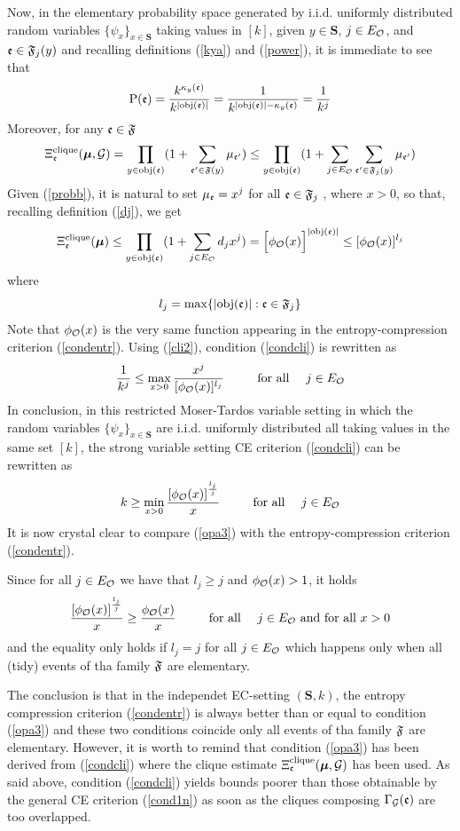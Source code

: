 \documentclass[11pt]{article}
\let\m=\mu \let\n=\nu \let\o=\omega    \let\p=\pi \let\ph=\varphi
\let\\=\noindent
\def\ee{\end{equation}}
\def\be{\begin{equation}}
\begin{document}
\\Now,  in the  elementary probability space generated by i.i.d. uniformly distributed random variables  $\{\psi_x\}_{x\in \mathbf{S}}$
taking values in $[k]$,  given  $y\in \mathbf{S}$, $j\in E_\A$, and  ${\mathfrak{e}}\in {\mathfrak{F}}_j(y)$ and recalling definitions (\ref{kya}) and (\ref{power}),
it is immediate to see that
\be\label{probb}
\prob(\ev)= {k^{\k_y(\ev)}\over k^{|\obj(\ev)|}}= {1\over k^{|\obj(\ev)|-\k_y(\ev)}}  =  {1\over k^{j}}
\ee
Moreover, for any ${\mathfrak{e}}\in{\mathfrak{F}}$
\begin{equation}\label{des}
\Xi^{\rm clique}_\ev(\bm \m,\GG)=\prod_{y\in \obj(\ev)}(1+ \sum_{\ev'\in \fa(y)}\m_{\ev'})\le
\prod_{y\in \obj(\ev)}(1+ \sum_{j\in E_\A}\sum_{\ev'\in \fa_j(y)}\m_{\ev'})
\end{equation}
Given   (\ref{probb}), it is  natural to set $\m_\ev= x^j$   for all ${\mathfrak{e}}\in {\mathfrak{F}}_j$ , where $x>0$, so that,
recalling definition (\ref{dj}),  we get
\be\label{cli2}
\Xi^{\rm clique}_\ev(\bm \m)\le
\prod_{y\in \obj(\ev)}(1+ \sum_{j\in E_\A}d_jx^j)= \Big[\phi_\A(x)\Big]^{|\obj(\ev)|}\le  [\phi_\A(x)]^{l_j}
\ee
where
$$
l_j=\max\{|{\rm obj}({\mathfrak{e}})|: {\mathfrak{e}}\in{\mathfrak{F}}_j\}
$$
Note that $\phi_{{\mathcal O}}(x)$ is the very same function appearing in the entropy-compression criterion
(\ref{condentr}). Using (\ref{cli2}), condition (\ref{condcli}) is rewritten as
$$
{1\over k^{j}}\le\max_{x>0}{x^{j}\over  [\phi_{{{\mathcal O}}}(x)]^{l_j}} ~~~~~~~\mbox{ for  all~~~ $j\in E_{{\mathcal O}}$}
$$
In conclusion, in this restricted Moser-Tardos variable setting in which the
random variables  $\{\psi_x\}_{x\in \mathbf{S}}$ are i.i.d. uniformly distributed all taking values in the same set $[k]$,
the strong variable setting CE criterion (\ref{condcli}) can be rewritten as
\be\label{opa3}
k\ge \min_{x>0}{\left[\phi_\A(x)\right]^{l_j\over j}\over x}~~~~~~~\mbox{ for  all~~~ $j\in E_\A$}
\ee
It is now crystal clear to compare (\ref{opa3}) with the  entropy-compression criterion  (\ref{condentr}).

\\Since for all $j\in E_\A$  we have that $l_j\ge j$ and  $\phi_{{\mathcal O}}(x)>1$,  it holds
$$
{\left[\phi_{{\mathcal O}}(x)\right]^{l_j\over j}\over x}\ge  {\phi_{{\mathcal O}}(x)\over x}~~~~~~~\mbox{ for  all~~~ $j\in E_{{\mathcal O}}$ and for all  $x>0$}
$$
and the equality only holds if $l_j=j$ for all $j\in E_\A$ which happens only when all (tidy) events of tha family ${\mathfrak{F}}$ are elementary.

\\The conclusion is that  in the independet EC-setting $(\mathbf{S},k)$, the entropy compression criterion (\ref{condentr}) is always better than  or equal to condition (\ref{opa3})
and these two conditions coincide  only all  events of tha family ${\mathfrak{F}}$ are elementary. However, it is worth to remind
that condition (\ref{opa3}) has been derived from (\ref{condcli}) where the clique estimate
$\Xi^{\rm clique}_\ev(\bm \m,\GG)$ has been used. As said above, condition (\ref{condcli})
yields bounds poorer  than those  obtainable by the  general CE criterion (\ref{cond1n}) as soon as the cliques composing $\Gamma_{\cal G}({\mathfrak{e}})$ are
too overlapped.
\end{document}
